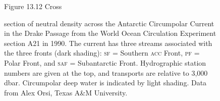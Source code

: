 \begin{figure}[t!] %
{}
\footnotesize
Figure 13.12 Cross \rule{0mm}{3ex}section of neutral density across
the Antarctic Circumpolar Current in the Drake Passage from the World
Ocean Circulation Experiment
section A21 in 1990. The current has three streams associated with the
three fronts (dark shading): \textsc{sf} = Southern \textsc{acc}
Front, \textsc{pf} = Polar Front, and \textsc{saf} = Subantarctic
Front. Hydrographic station numbers are given at the top, and
transports are
relative to 3,000 dbar. Circumpolar deep water is indicated by light
shading.  Data from Alex Orsi, Texas A\&M University.

\label{fig:P16}
\vspace{-5ex}
\end{figure}

